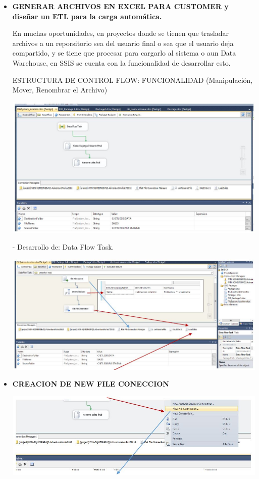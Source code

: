 \begin{itemize}
    \item \textbf{GENERAR ARCHIVOS EN EXCEL PARA CUSTOMER y diseñar un ETL para la carga automática.}

En muchas oportunidades, en proyectos donde se tienen que trasladar archivos a un reporsitorio sea del usuario final o sea que el usuario deja compartido, y se tiene que procesar para cargarlo al sistema o aun Data Warehouse, en SSIS se cuenta con la funcionalidad de desarrollar esto.

ESTRUCTURA DE CONTROL FLOW: FUNCIONALIDAD (Manipulación, Mover, Renombrar el Archivo)

	\begin{center}
	\includegraphics[width=17cm]{./Imagenes/26}
	\end{center}	

- Desarrollo de: Data Flow Task.

	\begin{center}
	\includegraphics[width=17cm]{./Imagenes/27}
	\end{center}	

    \item \textbf{CREACION DE NEW FILE CONECCION}

	\begin{center}
	\includegraphics[width=17cm]{./Imagenes/28}
	\end{center}	


\end{itemize}
